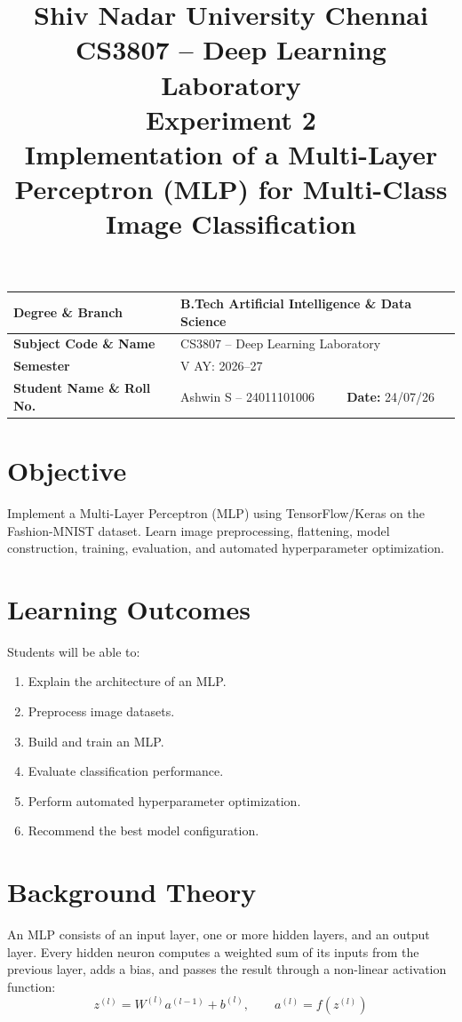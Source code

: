 \documentclass[11pt]{article}
\title{\textbf{Shiv Nadar University Chennai} \\[4pt]
CS3807 -- Deep Learning Laboratory \\[2pt]
Experiment 2 \\[6pt]
\large Implementation of a Multi-Layer Perceptron (MLP) for Multi-Class Image Classification}
\author{}
\date{}
\begin{document}
\maketitle
\thispagestyle{fancy}

\begin{center}
\begin{tabular}{|p{5.2cm}|p{5.2cm}|p{4cm}|}
\hline
\textbf{Degree \& Branch} & \multicolumn{2}{l|}{B.Tech Artificial Intelligence \& Data Science} \\
\hline
\textbf{Subject Code \& Name} & \multicolumn{2}{l|}{CS3807 -- Deep Learning Laboratory} \\
\hline
\textbf{Semester} & \multicolumn{2}{l|}{V \quad AY: 2026--27} \\
\hline
\textbf{Student Name \& Roll No.} & Ashwin S -- 24011101006 & \textbf{Date:} 24/07/26 \\
\hline
\end{tabular}
\end{center}

\section{Objective}
Implement a Multi-Layer Perceptron (MLP) using TensorFlow/Keras on the Fashion-MNIST dataset. Learn image preprocessing, flattening, model construction, training, evaluation, and automated hyperparameter optimization.

\section{Learning Outcomes}
Students will be able to:
\begin{enumerate}
    \item Explain the architecture of an MLP.
    \item Preprocess image datasets.
    \item Build and train an MLP.
    \item Evaluate classification performance.
    \item Perform automated hyperparameter optimization.
    \item Recommend the best model configuration.
\end{enumerate}

\section{Background Theory}
An MLP consists of an input layer, one or more hidden layers, and an output layer. Every hidden neuron computes a weighted sum of its inputs from the previous layer, adds a bias, and passes the result through a non-linear activation function:
\[
z^{(l)} = W^{(l)} a^{(l-1)} + b^{(l)}, \qquad a^{(l)} = f(z^{(l)})
\]
\end{document}
